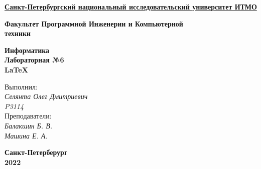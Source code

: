 
\begin{titlepage}
\newpage

\begin{center}
    \underline{\bfseries Санкт-Петербургский национальный исследовательский университет ИТМО
    }
\end{center}
\vspace{2cm}
\begin{center}
    \LARGE{\bfseries Факультет Программной Инженерии и Компьютерной \\техники
    }
\end{center}

\vspace{4cm}
\begin{center}
    \Huge{\bfseries Информатика \\
    Лабораторная №6\\
    \LaTeX}
    
\end{center}
\vspace{4cm}
\begin{flushright}
    \Large{Выполнил:\\
    \textit{
    Селянта Олег Дмитриевич
    \\
    P3114\\
    }
    Преподаватели:\\
    \textit{Балакшин Б. В.\\
    Машина Е. А.\\
    }
    }
    \vspace{\fill}
    \begin{center}
        \bfseries{Санкт-Петерберург\\
        2022
        }
    \end{center}
\end{flushright}
\end{titlepage}
